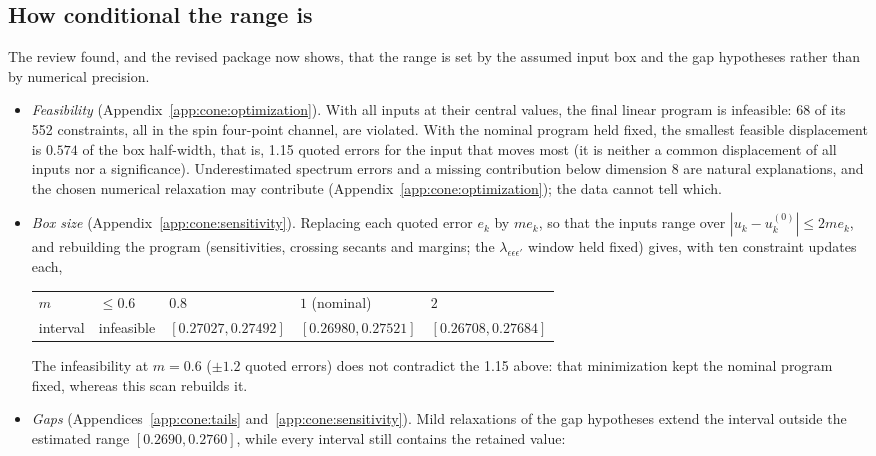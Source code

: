 \documentclass[11pt,a4paper]{article}
\numberwithin{equation}{section}
\begin{document}
\subsection{How conditional the range is}\label{sec:howcond}
The review found, and the revised package now shows, that the range is set by the assumed input box and the gap
hypotheses rather than by numerical precision.
\begin{itemize}
\item \emph{Feasibility} (Appendix~\ref{app:cone:optimization}). With all inputs at their central values, the final
 linear program is infeasible: 68 of
 its 552 constraints, all in the spin four-point channel, are violated. With the nominal program held fixed, the
 smallest feasible displacement is $0.574$ of the box half-width, that is, 1.15 quoted errors for the input that moves
 most (it is neither a common displacement of all inputs nor a significance). Underestimated spectrum errors and
 a missing contribution below dimension 8 are natural explanations, and the chosen numerical relaxation may contribute
 (Appendix~\ref{app:cone:optimization}); the data cannot tell which.
\item \emph{Box size} (Appendix~\ref{app:cone:sensitivity}). Replacing each quoted error $e_k$ by $me_k$, so that the inputs range over
 $|u_k-u_k^{(0)}|\le2me_k$, and rebuilding the program (sensitivities, crossing secants and margins; the
 $\lambda_{\epsilon\epsilon\epsilon'}$ window held fixed) gives, with ten constraint updates each,
\begin{center}\small
\begin{tabular}{@{}lllll@{}}
\toprule
$m$ & $\le0.6$ & $0.8$ & $1$ (nominal) & $2$\\
interval & infeasible & $[0.27027,0.27492]$ & $[0.26980,0.27521]$ & $[0.26708,0.27684]$\\
\bottomrule
\end{tabular}
\end{center}
 The infeasibility at $m=0.6$ ($\pm1.2$ quoted errors) does not contradict the 1.15 above: that minimization kept the
 nominal program fixed, whereas this scan rebuilds it.
\item \emph{Gaps} (Appendices~\ref{app:cone:tails} and~\ref{app:cone:sensitivity}). Mild relaxations of the gap hypotheses extend the interval outside the estimated range
 $[0.2690,0.2760]$, while every interval still contains the retained value:
\begin{center}\small
\begin{tabular}{@{}lllll@{}}

\end{tabular}
\end{center}
\end{itemize}
\end{document}
